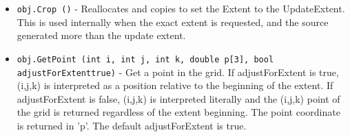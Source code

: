 \begin{itemize}
\item  \verb|obj.Crop ()| -  Reallocates and copies to set the Extent to the UpdateExtent.
 This is used internally when the exact extent is requested, 
 and the source generated more than the update extent. 

\item  \verb|obj.GetPoint (int i, int j, int k, double p[3], bool adjustForExtenttrue)| -  Get a point in the grid. If adjustForExtent is true, (i,j,k) is 
 interpreted as a position relative to the beginning of the extent.
 If adjustForExtent is false, (i,j,k) is interpreted literally
 and the (i,j,k) point of the grid is returned regardless of the 
 extent beginning.
 The point coordinate is returned in 'p'.
 The default adjustForExtent is true.

\end{itemize}
